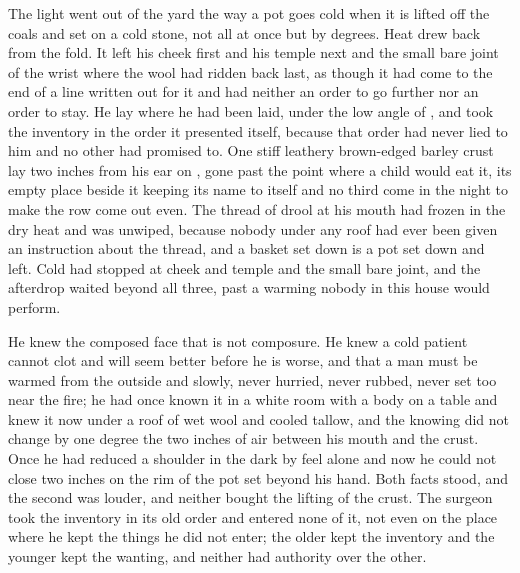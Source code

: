 \scenebreak

The light went out of the yard the way a pot goes cold when it is lifted off the coals and set on a cold stone, not all at once but by degrees. Heat drew back from the fold. It left his cheek first and his temple next and the small bare joint of the wrist where the wool had ridden back last, as though it had come to the end of a line written out for it and had neither an order to go further nor an order to stay. He lay where he had been laid, under the low angle of , and took the inventory in the order it presented itself, because that order had never lied to him and no other had promised to. One stiff leathery brown-edged barley crust lay two inches from his ear on , gone past the point where a child would eat it, its empty place beside it keeping its name to itself and no third come in the night to make the row come out even. The thread of drool at his mouth had frozen in the dry heat and was unwiped, because nobody under any roof had ever been given an instruction about the thread, and a basket set down is a pot set down and left. Cold had stopped at cheek and temple and the small bare joint, and the afterdrop waited beyond all three, past a warming nobody in this house would perform.

He knew the composed face that is not composure. He knew a cold patient cannot clot and will seem better before he is worse, and that a man must be warmed from the outside and slowly, never hurried, never rubbed, never set too near the fire; he had once known it in a white room with a body on a table and knew it now under a roof of wet wool and cooled tallow, and the knowing did not change by one degree the two inches of air between his mouth and the crust. Once he had reduced a shoulder in the dark by feel alone and now he could not close two inches on the rim of the pot set beyond his hand. Both facts stood, and the second was louder, and neither bought the lifting of the crust. The surgeon took the inventory in its old order and entered none of it, not even on the place where he kept the things he did not enter; the older kept the inventory and the younger kept the wanting, and neither had authority over the other.

